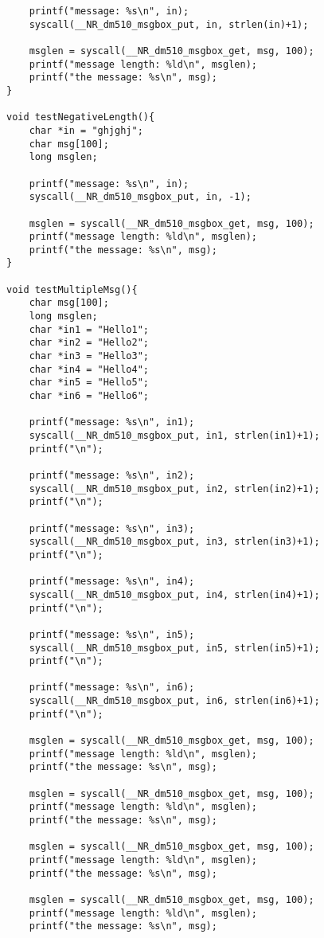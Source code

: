 \documentclass[12pt,a4paper]{report}
\begin{document}
\begin{verbatim}
    printf("message: %s\n", in);
    syscall(__NR_dm510_msgbox_put, in, strlen(in)+1);

    msglen = syscall(__NR_dm510_msgbox_get, msg, 100);
    printf("message length: %ld\n", msglen);
    printf("the message: %s\n", msg);
}

void testNegativeLength(){
    char *in = "ghjghj";
    char msg[100];
    long msglen;

    printf("message: %s\n", in);
    syscall(__NR_dm510_msgbox_put, in, -1);

    msglen = syscall(__NR_dm510_msgbox_get, msg, 100);
    printf("message length: %ld\n", msglen);
    printf("the message: %s\n", msg);
}

void testMultipleMsg(){
    char msg[100];
    long msglen;
    char *in1 = "Hello1";
    char *in2 = "Hello2";
    char *in3 = "Hello3";
    char *in4 = "Hello4";
    char *in5 = "Hello5";
    char *in6 = "Hello6";

    printf("message: %s\n", in1);
    syscall(__NR_dm510_msgbox_put, in1, strlen(in1)+1);
    printf("\n");

    printf("message: %s\n", in2);
    syscall(__NR_dm510_msgbox_put, in2, strlen(in2)+1);
    printf("\n");

    printf("message: %s\n", in3);
    syscall(__NR_dm510_msgbox_put, in3, strlen(in3)+1);
    printf("\n");

    printf("message: %s\n", in4);
    syscall(__NR_dm510_msgbox_put, in4, strlen(in4)+1);
    printf("\n");

    printf("message: %s\n", in5);
    syscall(__NR_dm510_msgbox_put, in5, strlen(in5)+1);
    printf("\n");

    printf("message: %s\n", in6);
    syscall(__NR_dm510_msgbox_put, in6, strlen(in6)+1);
    printf("\n");

    msglen = syscall(__NR_dm510_msgbox_get, msg, 100);
    printf("message length: %ld\n", msglen);
    printf("the message: %s\n", msg);

    msglen = syscall(__NR_dm510_msgbox_get, msg, 100);
    printf("message length: %ld\n", msglen);
    printf("the message: %s\n", msg);

    msglen = syscall(__NR_dm510_msgbox_get, msg, 100);
    printf("message length: %ld\n", msglen);
    printf("the message: %s\n", msg);

    msglen = syscall(__NR_dm510_msgbox_get, msg, 100);
    printf("message length: %ld\n", msglen);
    printf("the message: %s\n", msg);


\end{verbatim}
\end{document}
